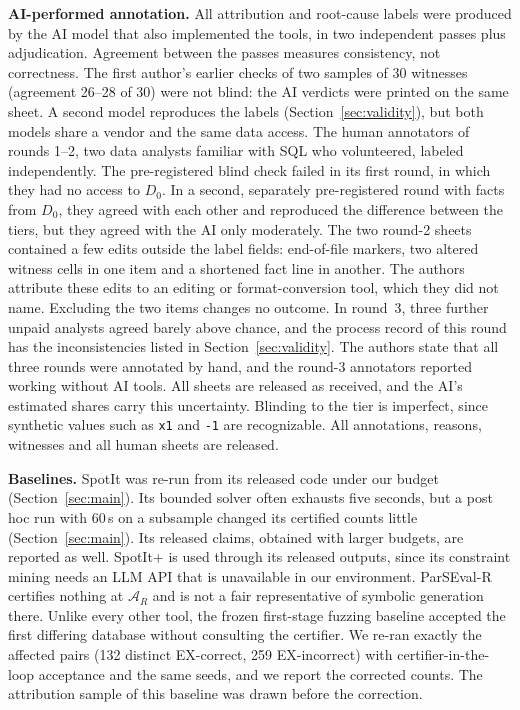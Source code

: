 \textbf{AI-performed annotation.} All attribution and root-cause labels were produced by the AI model that also implemented the tools, in two independent passes plus adjudication. Agreement between the passes measures consistency, not correctness. The first author's earlier checks of two samples of 30 witnesses (agreement 26--28 of 30) were not blind: the AI verdicts were printed on the same sheet. A second model reproduces the labels (Section~\ref{sec:validity}), but both models share a vendor and the same data access. The human annotators of rounds 1--2, two data analysts familiar with SQL who volunteered, labeled independently. The pre-registered blind check failed in its first round, in which they had no access to $D_0$. In a second, separately pre-registered round with facts from $D_0$, they agreed with each other and reproduced the difference between the tiers, but they agreed with the AI only moderately. The two round-2 sheets contained a few edits outside the label fields: end-of-file markers, two altered witness cells in one item and a shortened fact line in another. The authors attribute these edits to an editing or format-conversion tool, which they did not name. Excluding the two items changes no outcome. In round~3, three further unpaid analysts agreed barely above chance, and the process record of this round has the inconsistencies listed in Section~\ref{sec:validity}. The authors state that all three rounds were annotated by hand, and the round-3 annotators reported working without AI tools. All sheets are released as received, and the AI's estimated shares carry this uncertainty. Blinding to the tier is imperfect, since synthetic values such as \texttt{\textquotesingle{}x1\textquotesingle{}} and \texttt{-1} are recognizable. All annotations, reasons, witnesses and all human sheets are released.

\textbf{Baselines.} SpotIt was re-run from its released code under our budget (Section~\ref{sec:main}). Its bounded solver often exhausts five seconds, but a post hoc run with 60\,s on a subsample changed its certified counts little (Section~\ref{sec:main}). Its released claims, obtained with larger budgets, are reported as well. SpotIt+ is used through its released outputs, since its constraint mining needs an LLM API that is unavailable in our environment. ParSEval-R certifies nothing at $\mathcal A_R$ and is not a fair representative of symbolic generation there. Unlike every other tool, the frozen first-stage fuzzing baseline accepted the first differing database without consulting the certifier. We re-ran exactly the affected pairs (132 distinct EX-correct, 259 EX-incorrect) with certifier-in-the-loop acceptance and the same seeds, and we report the corrected counts. The attribution sample of this baseline was drawn before the correction.

